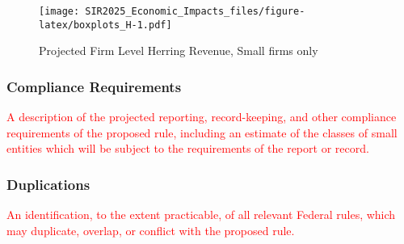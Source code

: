 \documentclass[
  12pt,
]{article}
\begin{document}
\begin{figure}
\centering
\texttt{[image: SIR2025\_Economic\_Impacts\_files/figure-latex/boxplots\_H-1.pdf]}
\caption{\label{figure_boxH}Projected Firm Level Herring Revenue, Small
firms only}
\end{figure}

\hypertarget{compliance-requirements}{%
\subsubsection{Compliance Requirements}\label{compliance-requirements}}

\textcolor{red}{A description of the projected reporting, record-keeping, and other compliance requirements of the proposed rule, including an estimate of the classes of small entities which will be subject to the requirements of the report or record.}

\hypertarget{duplications}{%
\subsubsection{Duplications}\label{duplications}}

\textcolor{red}{An identification, to the extent practicable, of all relevant Federal rules, which may duplicate, overlap, or conflict with the proposed rule.}

\newpage
\end{document}
